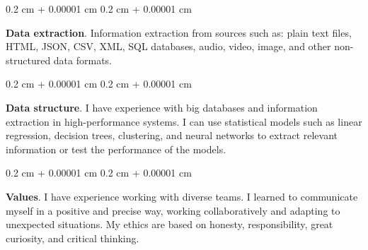 \documentclass[10pt, letterpaper]{article}
\newenvironment{onecolentry}{
    \begin{adjustwidth}{
        0.2 cm + 0.00001 cm
    }{
        0.2 cm + 0.00001 cm
    }
}{
    \end{adjustwidth}
} %
\begin{document}
        \begin{onecolentry}
            \textbf{Data extraction}. Information extraction from sources such as: plain text files, HTML, JSON, CSV, XML, SQL databases, audio, video, image, and other non-structured data formats.
        \end{onecolentry}
    
        \vspace{0.2cm}

        \begin{onecolentry}
            \textbf{Data structure}. I have experience with big databases and information extraction in high-performance systems. I can use statistical models such as linear regression, decision trees, clustering, and neural networks to extract relevant information or test the performance of the models.
        \end{onecolentry}

        \vspace{0.2cm}

        \begin{onecolentry}
            \textbf{Values}.  I have experience working with diverse teams. I learned to communicate myself in a positive and precise way, working collaboratively and adapting to unexpected situations. My ethics are based on honesty, responsibility, great curiosity, and critical thinking.
        \end{onecolentry}
        
\end{document}

